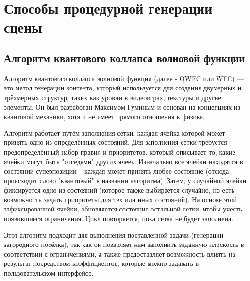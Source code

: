 \section{Способы процедурной генерации сцены}

\subsection{Алгоритм квантового коллапса волновой функции}

Алгоритм квантового коллапса волновой функции (далее - QWFC или WFC) — это метод генерации контента, который используется для создания двумерных и трёхмерных структур, таких как уровни в видеоиграх, текстуры и другие элементы. Он был разработан Максимом Гуминым и основан на концепциях из квантовой механики, хотя и не имеет прямого отношения к физике. \cite{QWFC}

Алгоритм работает путём заполнения сетки, каждая ячейка которой может принять одно из определённых состояний. Для заполнения сетки требуется предопределённый набор правил и приоритетов, который описывает то, какие ячейки могут быть "соседями" других ячеек. Изначально все ячейки находятся в состоянии суперпозиции -- каждая может принять любое состояние (отсюда происходит слово "квантовый" в названии алгоритма). Затем, у случайной ячейки фиксируется одно из состояний (которое также выбирается случайно, но есть возможность задать приоритеты для тех или иных состояний). На основе этой зафиксированной ячейки, обновляется состояние остальной сетки, чтобы учесть появившиеся ограничения. Цикл повторяется, пока сетка не будет заполнена.

Этот алгоритм подходит для выполнения поставленной задачи (генерации загородного посёлка), так как он позволяет нам заполнить заданную плоскость в соответствии с ограничениями, а также предоставляет возможность влиять на результат посредством коэффициентов, которые можно задавать в пользовательском интерфейсе.
